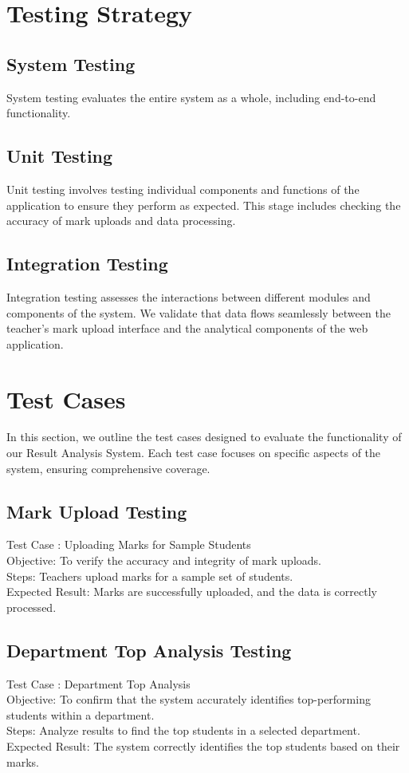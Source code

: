 \documentclass{nascproject}
\begin{document}
\section{Testing Strategy}
\subsection{System Testing}
System testing evaluates the entire system as a whole, including end-to-end functionality. 
\subsection{Unit Testing}
Unit testing involves testing individual components and functions of the application to ensure they perform as expected. This stage includes checking the accuracy of mark uploads and data processing.
\subsection{Integration Testing}
Integration testing assesses the interactions between different modules and components of the system. We validate that data flows seamlessly between the teacher's mark upload interface and the analytical components of the web application.
\section{Test Cases}
In this section, we outline the test cases designed to evaluate the functionality of our Result Analysis System. Each test case focuses on specific aspects of the system, ensuring comprehensive coverage.
\subsection{Mark Upload Testing}
Test Case : Uploading Marks for Sample Students\\
Objective: To verify the accuracy and integrity of mark uploads.\\
Steps: Teachers upload marks for a sample set of students.\\
Expected Result: Marks are successfully uploaded, and the data is correctly processed.
\subsection{Department Top Analysis Testing}
Test Case : Department Top Analysis\\
Objective: To confirm that the system accurately identifies top-performing students within a department.\\
Steps: Analyze results to find the top students in a selected department.\\
Expected Result: The system correctly identifies the top students based on their marks.
\end{document}
